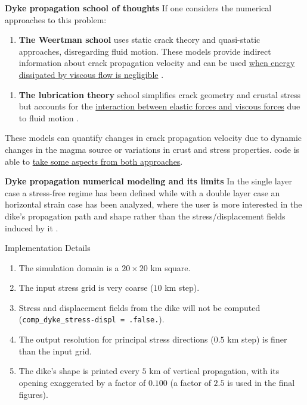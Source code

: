 \documentclass[9pt]{beamer}
\newcommand\Fonttab{\fontsize{12}{7.2}\selectfont}
\begin{document}
\begin{frame}[allowframebreaks]{\textbf{Dyke propagation school of thoughts}}
\Fonttab
If one considers the numerical approaches to this problem:
\begin{enumerate}
\item \textbf{The Weertman school} uses static crack theory and quasi-static approaches, disregarding fluid motion. These models provide indirect information about crack propagation velocity and can be used \underline{when energy dissipated by viscous flow is negligible} \cite{Weertman1971}. 
\end{enumerate}
\begin{enumerate}
\item \textbf{The lubrication theory} school simplifies crack geometry and crustal stress but accounts for the \underline{interaction between elastic forces and viscous forces} due to fluid motion \cite{lecampion2018}.  
\end{enumerate}
These models can quantify changes in crack propagation velocity due to dynamic changes in the magma source or variations in crust and stress properties. \colorbox{yellow}{\cite{furst2023}} code is able to \underline{take some aspects from both approaches}.
\end{frame}

\begin{frame}{\textbf{Dyke propagation numerical modeling and its limits}}
\Fonttab
In the single layer case a stress-free regime has been defined while with a double layer case an horizontal strain case has been analyzed, where the user is more interested in the dike's propagation path and shape rather than the stress/displacement fields induced by it \colorbox{yellow}{\cite{maccaferri2011}}.
    \begin{alertblock}{Implementation Details}
        \begin{enumerate}
            \item The simulation domain is a $20 \times 20$ km square.
            \item The input stress grid is very coarse ($10$ km step).
            \item Stress and displacement fields from the dike will not be computed (\texttt{comp\_dyke\_stress-displ = .false.}).
            \item The output resolution for principal stress directions ($0.5$ km step) is finer than the input grid.
            \item The dike's shape is printed every $5$ km of vertical propagation, with its opening exaggerated by a factor of $0.100$ (a factor of $2.5$ is used in the final figures).
        \end{enumerate}
    \end{alertblock}
\end{frame}
\end{document}
